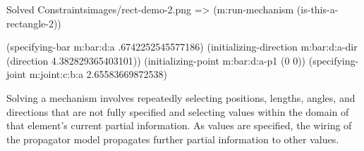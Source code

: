 \begin{img-example}
[label=is-rect-solved]
{Solved Constraints}{images/rect-demo-2.png}
=> (m:run-mechanism (is-this-a-rectangle-2))

(specifying-bar m:bar:d:a .6742252545577186)
(initializing-direction m:bar:d:a-dir (direction 4.382829365403101))
(initializing-point m:bar:d:a-p1 (0 0))
(specifying-joint m:joint:c:b:a 2.65583669872538)
\end{img-example}

Solving a mechanism involves repeatedly selecting positions, lengths,
angles, and directions that are not fully specified and selecting
values within the domain of that element's current partial
information. As values are specified, the wiring of the propagator
model propagates further partial information to other values.

